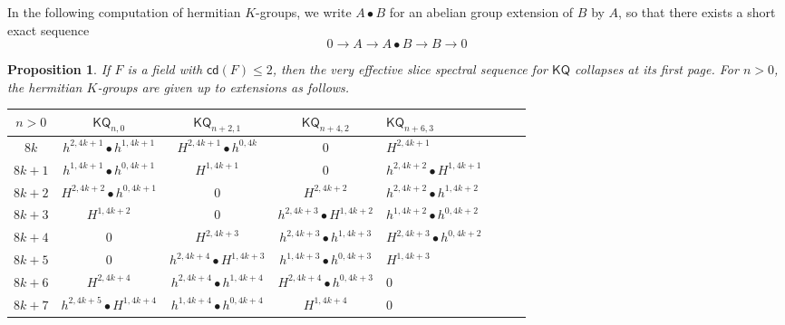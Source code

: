 \documentclass[11pt,hyp,english]{article}
\newcommand{\KQ}{\mathsf{KQ}}
\newcommand{\GW}{\mathsf{GW}}
\newcommand{\wt}[1]{\widetilde{#1}}
\newcommand{\cd}{{\mathsf{cd}}}
\newtheorem{proposition}[theorem]{Proposition}
\theoremstyle{definition}
\begin{document}
In the following computation of hermitian 
$K$-groups, 
we write $A\bullet B$ for an abelian 
group extension of $B$ by $A$, 
so that there exists a short exact 
sequence 
$$
0\to A\to A \bullet B\to B\to 0
$$

\begin{proposition}
\label{prop:KQn0}
If $F$ is a field with $\cd(F)\le2$, then the very effective slice spectral sequence for $\KQ$ collapses at its first page. 
For $n>0$, the hermitian $K$-groups are given up to extensions as follows.
\begin{center}
 \begin{tabularx}{\textwidth}{c | c | c | c | l l l l} 
 \toprule
 $n>0$ 
 & $\KQ_{n,0}$ & $\KQ_{n+2,1}$ & $\KQ_{n+4,2}$ & $\KQ_{n+6,3}$ \\
 \midrule
$8k$ & $h^{2,4k+1}\bullet h^{1,4k+1}$ & $H^{2,4k+1}\bullet h^{0,4k}$ & $0$  & $H^{2,4k+1}$ \\
$8k+1$ & $h^{1,4k+1}\bullet h^{0,4k+1}$ & $H^{1,4k+1}$ & $0$ & $h^{2,4k+2}\bullet {H}^{1,4k+1}$ \\
$8k+2$ & $H^{2,4k+2}\bullet h^{0,4k+1}$ & $0$ & $H^{2,4k+2}$ & $h^{2,4k+2}\bullet h^{1,4k+2}$\\
$8k+3$ & $H^{1,4k+2}$ & $0$ & $h^{2,4k+3}\bullet {H}^{1,4k+2}$ & $h^{1,4k+2}\bullet h^{0,4k+2}$ \\
$8k+4$ & $0$ & $H^{2,4k+3}$ & $h^{2,4k+3}\bullet h^{1,4k+3}$ & $H^{2,4k+3}\bullet h^{0,4k+2}$ \\
$8k+5$ & $0$ & $h^{2,4k+4}\bullet {H}^{1,4k+3}$ & $h^{1,4k+3}\bullet h^{0,4k+3}$ & $H^{1,4k+3}$\\
$8k+6$ & ${H}^{2,4k+4}$ & $h^{2,4k+4}\bullet h^{1,4k+4}$& $H^{2,4k+4}\bullet h^{0,4k+3}$ & $0$ \\
$8k+7$ & $h^{2,4k+5}\bullet {H}^{1,4k+4}$ & $h^{1,4k+4}\bullet h^{0,4k+4}$ & $H^{1,4k+4}$ & $0$ \\
\bottomrule
\end{tabularx}
\end{center}

\end{proposition}
\end{document}
